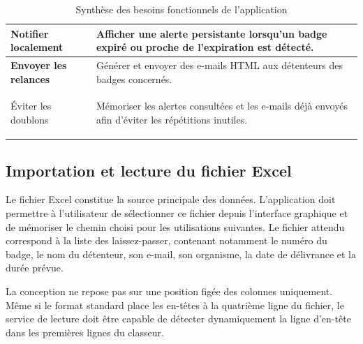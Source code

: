\documentclass[12pt,a4paper,openany]{report}
\begin{document}
\begin{table}[H]
\begin{tabularx}{\textwidth}{|>{\raggedright\arraybackslash\bfseries}p{}|>{\raggedright\arraybackslash}X|}
\rowcolor{ondaBlue!5} 
Notifier localement & Afficher une alerte persistante lorsqu'un badge expiré ou proche de l'expiration est détecté. \\
\hline

Envoyer les relances & Générer et envoyer des e-mails HTML aux détenteurs des badges concernés. \\
\hline

\rowcolor{ondaBlue!5} 
Éviter les doublons & Mémoriser les alertes consultées et les e-mails déjà envoyés afin d'éviter les répétitions inutiles. \\
\hline

\end{tabularx}
\caption{Synthèse des besoins fonctionnels de l'application}
\label{tab:besoins-fonctionnels}
\end{table}

\subsection{Importation et lecture du fichier Excel}

Le fichier Excel constitue la source principale des données. L'application doit
permettre à l'utilisateur de sélectionner ce fichier depuis l'interface graphique
et de mémoriser le chemin choisi pour les utilisations suivantes. Le fichier
attendu correspond à la liste des laissez-passer, contenant notamment le numéro
du badge, le nom du détenteur, son e-mail, son organisme, la date de délivrance
et la durée prévue.

La conception ne repose pas sur une position figée des colonnes uniquement.
Même si le format standard place les en-têtes à la quatrième ligne du fichier,
le service de lecture doit être capable de détecter dynamiquement la ligne
d'en-tête dans les premières lignes du classeur.
\end{document}
